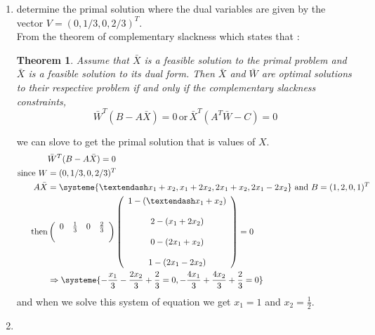 \documentclass[12pt,a4paper]{article}
\newtheorem{thm}{Theorem}
\begin{document}
	\begin{enumerate}[label=(\alph*)]
		\item  determine the primal solution where the dual variables are given by the vector $V=(0, 1/3, 0, 2/3)^T$.\\
		From the theorem of complementary slackness which states that :
		\begin{thm}\label{thm1}
			Assume that $\bar{X}$ is a feasible solution to the primal problem and $\bar{X}$ is a feasible solution to its dual form. Then $\bar{X}$ and
			$\bar{W}$ are optimal solutions to their respective problem if and only if the
			complementary slackness constraints,
			$$\bar{W}^T( B - A\bar{X})= 0 \,\text{or} \,\bar{X}^T (A^T \bar{W}-C )= 0$$
		\end{thm}
		we can slove to get the primal solution that is values of $X$.\\
		\begin{align}
		&\bar{W}^T( B - A\bar{X})= 0\\
		\text{since }W&=(0, 1/3, 0, 2/3)^T\\
		 A\bar{X} &= \systeme{–x_1 + x_2,x_1 + 2x_2,2x_1 + x_2,2x_1-2x_2} ~\text{and}~ B=(1,2,0,1)^T\\
		 \text{then}&\left( \begin{array}{cccc} 0 & \frac{1}{3} & 0 & \frac{2}{3} \\\\ \end{array} \right)\left( \begin{array}{c} 1-(–x_1 + x_2) \\\\ 2-(x_1 + 2x_2) \\\\ 0-(2x_1 + x_2)\\\\ 1-(2x_1-2x_2)\end{array} \right)=0\\
		 &\Rightarrow \systeme{-\frac{x_1}{3}-\frac{2x_2}{3} + \frac{2}{3}=0,-\frac{4x_1}{3}+\frac{4x_2}{3} + \frac{2}{3}=0}\\
		 \end{align}
		 and when we solve this system of equation we get $x_1=1$ and $x_2=\frac{1}{2}$.
		 
		 \item 
	\end{enumerate}
\end{document}
